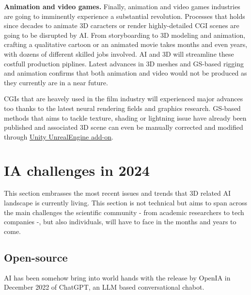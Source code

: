 \noindent \textbf{Animation and video games.} Finally, animation and video games industries are going to imminently experience a substantial revolution. Processes that holds since decades to animate 3D caracters or render highly-detailed \ac{CGI} scenes are going to be disrupted by \ac{AI}. From storyboarding to 3D modeling and animation, crafting a qualitative cartoon or an animated movie takes months and even years, with dozens of different skilled jobs involved. \ac{AI} and 3D will streamline these costfull production piplines. Latest advances in 3D meshes and \ac{GS}-based rigging and animation \citep{qian2023gaussianavatars,li2024animatablegaussians} confirms that both animation and video would not be produced as they currently are in a near future. 

\ac{CGI}s that are heavely used in the film industry will experienced major advances too thanks to the latest neural rendering fields and graphics research. \ac{GS}-based methods that aims to tackle texture, shading or lightning issue have already been published \citep{jiang2023gaussianshader,wu2024deferredgs} and associated 3D scene can even be manually corrected and modified through \href{https://github.com/aras-p/UnityGaussianSplatting/}{Unity UnrealEngine add-on}. 


\section{IA challenges in 2024}

This section embrasses the most recent issues and trends that 3D related \ac{AI} landscape is currently living. This section is not technical but aims to span across the main challenges the scientific community - from academic researchers to tech companies -, but also individuals, will have to face in the months and years to come. 

\subsection{Open-source}
\ac{AI} has been somehow bring into world hands with the release by OpenIA in December 2022 of ChatGPT, an \ac{LLM} based conversational chabot. 

